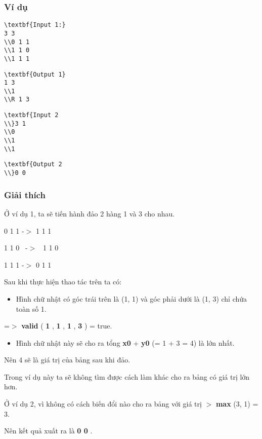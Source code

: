 \subsubsection{   Ví dụ  }
\begin{verbatim}
\textbf{Input 1:}
3 3
\\0 1 1
\\1 1 0
\\1 1 1
\end{verbatim}
\begin{verbatim}
\textbf{Output 1}
1 3
\\1
\\R 1 3
\end{verbatim}
\begin{verbatim}
\textbf{Input 2
\\}3 1
\\0
\\1
\\1\end{verbatim}
\begin{verbatim}
\textbf{Output 2
\\}0 0\end{verbatim}

\subsubsection{   Giải thích  }

   Ở ví dụ 1, ta sẽ tiến hành đảo 2 hàng 1 và 3 cho nhau.  

    0 1 1      -$>$   1 1 1

   1 1 0  -$>$  1 1 0  

1 1 1   -$>$       0 1 1   

   Sau khi thực hiện thao tác trên ta có:  
\begin{itemize}
	\item     Hình chữ nhật có góc trái trên là (1, 1) và góc phải dưới là (1, 3) chỉ chứa toàn số 1.   
\end{itemize}

   =$>$   \textbf{    valid   }   (   \textbf{    1   }   ,   \textbf{    1   }   ,   \textbf{    1   }   ,   \textbf{    3   }   ) = true.  
\begin{itemize}
	\item     Hình chữ nhật này sẽ cho ra tổng    \textbf{     x0    }    +    \textbf{     y0    }    (= 1 + 3 = 4) là lớn nhất.   
\end{itemize}

   Nên 4 sẽ là giá trị của bảng sau khi đảo.  

   Trong ví dụ này ta sẽ không tìm được cách làm khác cho ra bảng có giá trị lớn hơn.  

   Ở ví dụ 2, vì không có cách biến đổi nào cho ra bảng với giá trị   \textbf{}\textbf{    $>$   }\textbf{    max   }   (3, 1) = 3.  

   Nên kết quả xuất ra là   \textbf{    0 0   }   .  
